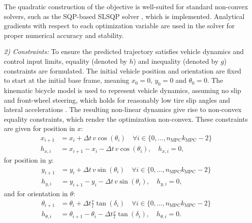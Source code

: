 \documentclass[journal]{IEEEtran}
\begin{document}
The quadratic construction of the objective is well-suited for standard non-convex solvers, such as the SQP-based SLSQP solver \cite{Kraft1994}, which is implemented. Analytical gradients with respect to each optimization variable are used in the solver for proper numerical accuracy and stability.

\indent \textit{2) Constraints:} To ensure the predicted trajectory satisfies vehicle dynamics and control input limits, equality (denoted by $h$) and inequality (denoted by $g$) constraints are formulated. The initial vehicle position and orientation are fixed to start at the initial base frame, meaning $x_0=0$, $y_0=0$ and $\theta_0=0$. The kinematic bicycle model \cite{Rajamani2012} is used to represent vehicle dynamics, assuming no slip and front-wheel steering, which holds for reasonably low tire slip angles and lateral accelerations \cite{Polack2017}. The resulting non-linear dynamics give rise to non-convex equality constraints, which render the optimization non-convex. These constraints are given for position in $x$:
\begin{align}
    x_{i+1}&=x_i+\Delta t\,v\cos(\theta_i) \quad \forall i\in \{0,...,n_\text{MPC}k_\text{MPC}-2\} \nonumber \\
    h_{x,i} &= x_{i+1} - x_i - \Delta t \, v \cos(\theta_i), \quad h_{x,i} = 0,
    \label{3.1.20}
\end{align}
for position in $y$:
\begin{align}
    y_{i+1}&=y_i+\Delta t\,v\sin(\theta_i) \quad \forall i\in \{0,...,n_\text{MPC}k_\text{MPC}-2\} \nonumber \\
    h_{y,i} &= y_{i+1} - y_i - \Delta t \, v \sin(\theta_i), \quad h_{y,i} = 0,
    \label{3.1.21}
\end{align}
and for orientation in $\theta$:
\begin{align}
    \theta_{i+1}&=\theta_i+\Delta t\frac{v}{l}\tan(\delta_i) \quad \forall i\in \{0,...,n_\text{MPC}k_\text{MPC}-2\} \nonumber \\
    h_{\theta,i} &= \theta_{i+1}-\theta_i-\Delta t\frac{v}{l}\tan(\delta_i), \quad h_{\theta,i} = 0.
    \label{3.1.23}
\end{align}
\end{document}
